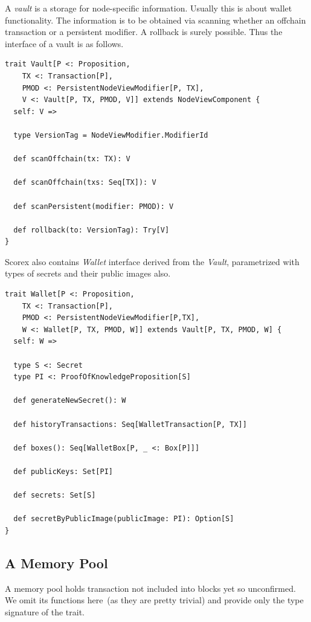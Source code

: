 \documentclass[]{report}   %
\begin{document}
A \textit{vault} is a storage for node-specific information. Usually this is about wallet functionality. The information is to be obtained via scanning whether an offchain transaction or a persistent modifier. A rollback is surely possible. Thus the interface of a vault is as follows.  

\begin{lstlisting}
trait Vault[P <: Proposition, 
	TX <: Transaction[P],
    PMOD <: PersistentNodeViewModifier[P, TX], 
    V <: Vault[P, TX, PMOD, V]] extends NodeViewComponent {
  self: V =>

  type VersionTag = NodeViewModifier.ModifierId

  def scanOffchain(tx: TX): V

  def scanOffchain(txs: Seq[TX]): V

  def scanPersistent(modifier: PMOD): V

  def rollback(to: VersionTag): Try[V]
}
\end{lstlisting}

Scorex also contains \textit{Wallet} interface derived from the \textit{Vault}, parametrized with types of secrets and their public images also.

\begin{lstlisting}
trait Wallet[P <: Proposition, 
	TX <: Transaction[P], 
	PMOD <: PersistentNodeViewModifier[P,TX], 
	W <: Wallet[P, TX, PMOD, W]] extends Vault[P, TX, PMOD, W] {
  self: W =>

  type S <: Secret
  type PI <: ProofOfKnowledgeProposition[S]

  def generateNewSecret(): W

  def historyTransactions: Seq[WalletTransaction[P, TX]]

  def boxes(): Seq[WalletBox[P, _ <: Box[P]]]

  def publicKeys: Set[PI]

  def secrets: Set[S]

  def secretByPublicImage(publicImage: PI): Option[S]
}
\end{lstlisting}


\subsection{A Memory Pool}

A memory pool holds transaction not included into blocks yet so unconfirmed. We omit its functions here~(as they are pretty trivial) and provide only the type signature of the trait.  
\end{document}
